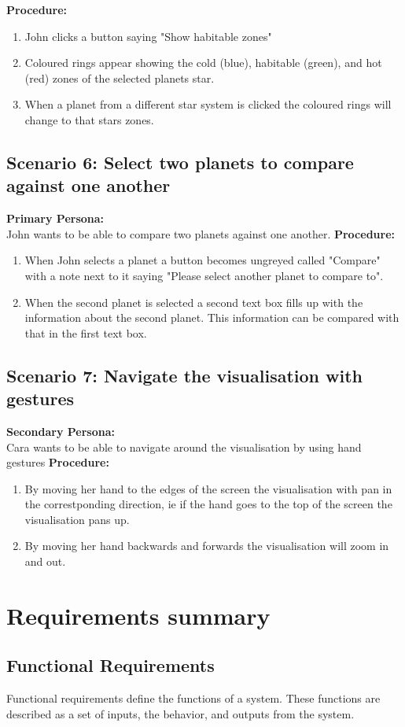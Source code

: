   {\bf  Procedure:}
   \begin{enumerate}
 \item John clicks a button saying "Show habitable zones"
 \item Coloured rings appear showing the cold (blue), habitable (green), and hot (red) zones of the selected planets star.
 \item When a planet from a different star system is clicked the coloured rings will change to that stars zones.
 \end{enumerate}
 \subsection{Scenario 6: Select two planets to compare against one another}
    {\bf  Primary Persona:}\\
John wants to be able to compare two planets against one another.
  {\bf  Procedure:}
   \begin{enumerate}
 \item When John selects a planet a button becomes ungreyed called "Compare" with a note next to it saying "Please select another planet to compare to".
 \item When the second planet is selected a second text box fills up with the information about the second planet. This information can be compared with that in the first text box.
  \end{enumerate}
  
 \subsection{Scenario 7: Navigate the visualisation with gestures}
    {\bf  Secondary Persona:}\\
Cara wants to be able to navigate around the visualisation by using hand gestures
  {\bf  Procedure:}
   \begin{enumerate}
 \item By moving her hand to the edges of the screen the visualisation with pan in the correstponding direction, ie if the hand goes to the top of the screen the visualisation pans up.
 \item By moving her hand backwards and forwards the visualisation will zoom in and out.
  \end{enumerate}
\section{Requirements summary}
\subsection{Functional Requirements}
Functional requirements define the functions of a system. These functions are described as a set of inputs, the behavior, and outputs from the system.

